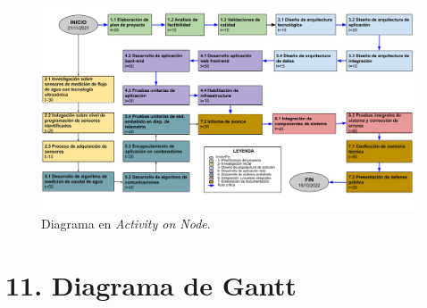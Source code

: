 \documentclass[
11pt, %
codirector, %
]{charter}
\begin{document}

\begin{landscape}

\begin{figure}[htpb]
\centering 
\includegraphics[scale=.6]{./Figuras/TF_MonAgua_AoN.png} 
\caption{Diagrama en \textit{Activity on Node}.}
\label{fig:AoN}
\end{figure}
\end{landscape}


\section{11. Diagrama de Gantt}
\label{sec:gantt}
\end{document}
